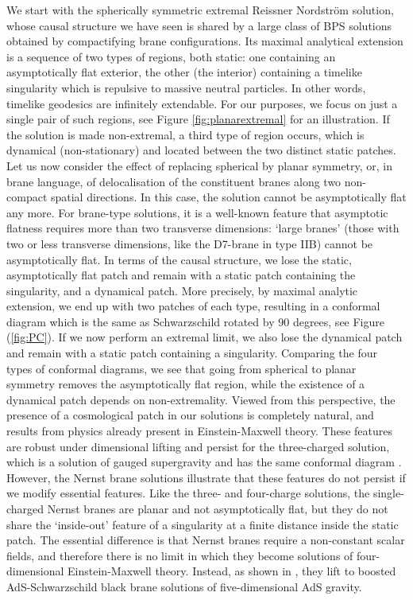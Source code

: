 We start with the spherically symmetric extremal Reissner Nordstr\"om solution, whose causal structure we have seen is shared by a large class of BPS solutions obtained by compactifying brane configurations. Its maximal analytical extension is a sequence of two types of regions, both static: one containing an asymptotically flat exterior, the other (the interior) containing a timelike singularity which is repulsive to massive neutral particles. In other words, timelike geodesics are infinitely extendable. For our purposes, we focus on just a single pair of such regions, see Figure \ref{fig:planarextremal} for an illustration. If the solution is made non-extremal, a third type of region occurs, which is dynamical (non-stationary) and located between the two distinct static patches. Let us now consider the effect of replacing spherical by planar symmetry, or, in brane language, of delocalisation of the constituent branes along two non-compact spatial directions. In this case, the solution cannot be asymptotically flat any more. For brane-type solutions, it is a well-known feature that asymptotic flatness requires more than two transverse dimensions: `large branes' (those with two or less transverse dimensions, like the D7-brane in type IIB) cannot be asymptotically flat. In terms of the causal structure, we lose the static, asymptotically flat patch and remain with a static patch containing the singularity, and a dynamical patch. More precisely, by maximal analytic extension, we end up with two patches of each type, resulting in a conformal diagram which is the same as Schwarzschild rotated by 90 degrees, see Figure (\ref{fig:PC}). If we now perform an extremal limit, we also lose the dynamical patch and remain with a static patch containing a singularity. Comparing the four types of conformal diagrams, we see that going from spherical to planar symmetry removes the asymptotically flat region, while the existence of a dynamical patch depends on non-extremality. Viewed from this perspective, the presence of a cosmological patch in our solutions is completely natural, and results from physics already present in Einstein-Maxwell theory. These features are robust under dimensional lifting and persist for the three-charged solution, which is a solution of gauged supergravity and has the same conformal diagram \cite{Gutowski:2019iyo}. However, the Nernst brane solutions \cite{Dempster:2015,Dempster:2016,Barisch:2011ui,Cardoso:2015wcf} illustrate that these features do not persist if we modify essential features. Like the three- and four-charge solutions, the single-charged Nernst branes are planar and not asymptotically flat, but they do not share the `inside-out' feature of a singularity at a finite distance inside the static patch. The essential difference is that Nernst branes require a non-constant scalar fields, and therefore there is no limit in which they become solutions of four-dimensional Einstein-Maxwell theory. Instead, as shown in \cite{Dempster:2016}, they lift to boosted AdS-Schwarzschild black brane solutions of five-dimensional AdS gravity.

